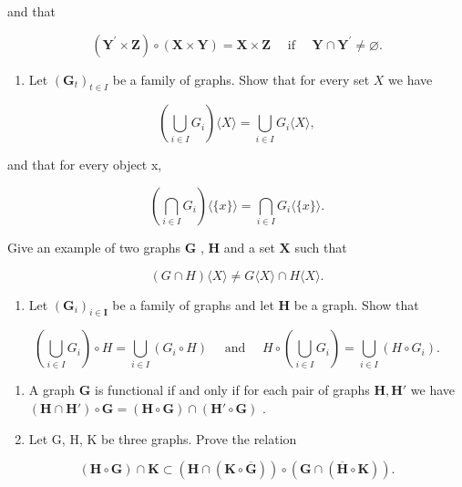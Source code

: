 and that

\[
(\mathbf {Y} ^ {\prime} \times \mathbf {Z}) \circ (\mathbf {X} \times \mathbf {Y}) = \mathbf {X} \times \mathbf {Z} \quad \text { if } \quad \mathbf {Y} \cap \mathbf {Y} ^ {\prime} \neq \varnothing .
\]

\begin{enumerate}
\def\labelenumi{\arabic{enumi}.}
\setcounter{enumi}{3}
\tightlist
\item
  Let \((\mathbf{G}_t)_{t\in I}\) be a family of graphs. Show that for every set \(X\) we have
\end{enumerate}

\[
\left(\bigcup_ {i \in I} G _ {i}\right) \langle X \rangle = \bigcup_ {i \in I} G _ {i} \langle X \rangle ,
\]

and that for every object x,

\[
\left(\bigcap_ {i \in I} G _ {i}\right) \langle \{x \} \rangle = \bigcap_ {i \in I} G _ {i} \langle \{x \} \rangle .
\]

Give an example of two graphs \(\mathbf{G}\) , \(\mathbf{H}\) and a set \(\mathbf{X}\) such that

\[
(G \cap H) \langle X \rangle \neq G \langle X \rangle \cap H \langle X \rangle .
\]

\begin{enumerate}
\def\labelenumi{\arabic{enumi}.}
\setcounter{enumi}{4}
\tightlist
\item
  Let \((\mathbf{G}_i)_{i\in \mathbf{I}}\) be a family of graphs and let \(\mathbf{H}\) be a graph. Show that
\end{enumerate}

\[
\left(\bigcup_ {i \in I} G _ {i}\right) \circ H = \bigcup_ {i \in I} (G _ {i} \circ H) \quad \text { and } \quad H \circ \left(\bigcup_ {i \in I} G _ {i}\right) = \bigcup_ {i \in I} (H \circ G _ {i}).
\]

\begin{enumerate}
\def\labelenumi{\arabic{enumi}.}
\setcounter{enumi}{5}
\item
  A graph \(\mathbf{G}\) is functional if and only if for each pair of graphs \(\mathbf{H}, \mathbf{H}'\) we have \((\mathbf{H} \cap \mathbf{H}') \circ \mathbf{G} = (\mathbf{H} \circ \mathbf{G}) \cap (\mathbf{H}' \circ \mathbf{G})\) .
\item
  Let G, H, K be three graphs. Prove the relation
\end{enumerate}

\[
(\mathbf {H} \circ \mathbf {G}) \cap \mathbf {K} \subset (\mathbf {H} \cap (\mathbf {K} \circ \overline {{\mathbf {G}}})) \circ (\mathbf {G} \cap (\overline {{\mathbf {H}}} \circ \mathbf {K})).
\]

